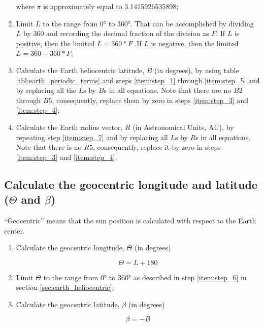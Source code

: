 \documentclass{article}
\begin{document}
\begin{enumerate}
  \par where $\pi$ is approximately equal to 3.1415926535898;

\item \label{tiem:step_6} Limit $L$ to the range from \ang{0} to
  \ang{360}. That can be accomplished by dividing $L$ by 360 and
  recording the decimal fraction of the division as $F$. If $L$ is
  positive, then the limited $L = 360 * F$ .If $L$ is negative, then
  the limited $L = 360 - 360 * F$;

\item \label{item:step_7} Calculate the Earth heliocentric latitude,
  $B$ (in degrees), by using table \ref{tbl:earth_periodic_terms} and
  steps \ref{item:step_1} through \ref{item:step_5} and by replacing
  all the $L$s by $B$s in all equations. Note that there are no $B2$
  through $B5$, consequently, replace them by zero in steps
  \ref{item:step_3} and \ref{item:step_4};

\item Calculate the Earth radius vector, $R$ (in Astronomical Units,
  AU), by repeating step \ref{item:step_7} and by replacing all $L$s
  by $R$s in all equations. Note that there is no $R5$, consequently,
  replace it by zero in steps \ref{item:step_3} and \ref{item:step_4}.

\end{enumerate}

\subsection{Calculate the geocentric longitude and latitude ($\Theta$ and
  $\beta$)}

\par “Geocentric” means that the sun position is calculated with respect
to the Earth center.

\begin{enumerate}
\item Calculate the geocentric longitude, $\Theta$ (in degrees)

  \begin{equation}
    \label{eq:theta}
    \Theta = L + 180
  \end{equation}

\item Limit $\Theta$ to the range from \ang{0} to \ang{360} as described in
  step \ref{item:step_6} in section \ref{sec:earth_heliocentric};

\item Calculate the geocentric latitude, $\beta$ (in degrees)

  \begin{equation}
    \label{eq:geo_lat}
    \beta = -B
  \end{equation}
\end{enumerate}
\end{document}
